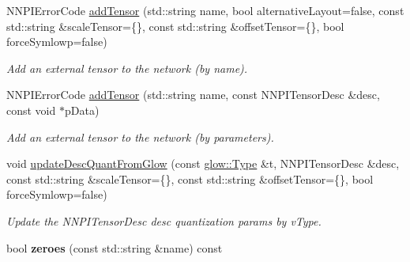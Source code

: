 \begin{DoxyCompactItemize}
N\+N\+P\+I\+Error\+Code \hyperlink{classglow_1_1_n_n_p_i_importer_a17439e3c3e7bd40b47b6fd27fa898da1}{add\+Tensor} (std\+::string name, bool alternative\+Layout=false, const std\+::string \&scale\+Tensor=\{\}, const std\+::string \&offset\+Tensor=\{\}, bool force\+Symlowp=false)
\begin{DoxyCompactList}\small\item\em Add an external tensor to the network (by name). \end{DoxyCompactList}\item 
\mbox{\label{classglow_1_1_n_n_p_i_importer_a4f8277b5ec56cd328eef94c9529fbdd1}} 
N\+N\+P\+I\+Error\+Code \hyperlink{classglow_1_1_n_n_p_i_importer_a4f8277b5ec56cd328eef94c9529fbdd1}{add\+Tensor} (std\+::string name, const N\+N\+P\+I\+Tensor\+Desc \&desc, const void $\ast$p\+Data)
\begin{DoxyCompactList}\small\item\em Add an external tensor to the network (by parameters). \end{DoxyCompactList}\item 
\mbox{\label{classglow_1_1_n_n_p_i_importer_a513557436fbe7559ba24cd15c2da0b15}} 
void \hyperlink{classglow_1_1_n_n_p_i_importer_a513557436fbe7559ba24cd15c2da0b15}{update\+Desc\+Quant\+From\+Glow} (const \hyperlink{structglow_1_1_type}{glow\+::\+Type} \&t, N\+N\+P\+I\+Tensor\+Desc \&desc, const std\+::string \&scale\+Tensor=\{\}, const std\+::string \&offset\+Tensor=\{\}, bool force\+Symlowp=false)
\begin{DoxyCompactList}\small\item\em Update the N\+N\+P\+I\+Tensor\+Desc {\ttfamily desc} quantization params by {\ttfamily v\+Type}. \end{DoxyCompactList}\item 
\mbox{\label{classglow_1_1_n_n_p_i_importer_ab483dc4972b6b248860f07130126ef77}} 
bool {\bfseries zeroes} (const std\+::string \&name) const
\end{DoxyCompactItemize}
